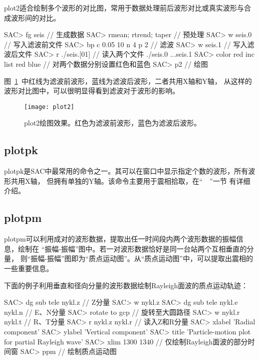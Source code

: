 plot2适合绘制多个波形的对比图，常用于数据处理前后波形对比或真实波形与合成波形间的对比。
\begin{SACCode}
SAC> fg seis                     // 生成数据
SAC> rmean; rtrend; taper        // 预处理
SAC> w seis.0                    // 写入滤波前文件
SAC> bp c 0.05 10 n 4 p 2        // 滤波
SAC> w seis.1                    // 写入滤波后文件
SAC> r ./seis.[01]               // 读入两个文件
./seis.0 ...seis.1
SAC> color red inc list red blue // 对两个数据分别设置红色和蓝色
SAC> p2                          // 绘图
\end{SACCode}
图~\ref{fig:plot2}~中红线为滤波前波形，蓝线为滤波后波形，二者共用X轴和Y轴，
从这样的波形对比图中，可以很明显得看到滤波对于波形的影响。

\begin{figure}[H]
\centering
\texttt{[image: plot2]}
\caption[plot2绘图效果]{plot2绘图效果。红色为滤波前波形，蓝色为滤波后波形。}
\label{fig:plot2}
\end{figure}

\subsection{plotpk}
plotpk是SAC中最常用的命令之一。其可以在窗口中显示指定个数的波形，所有波形共用X轴，
但拥有单独的Y轴。该命令主要用于震相拾取，在``~~''一节
有详细介绍。

\subsection{plotpm}
plotpm可以利用成对的波形数据，提取出任一时间段内两个波形数据的振幅信息，绘制在
``振幅-振幅''图中。若一对波形数据恰好是同一台站两个互相垂直的分量，
则``振幅-振幅''图即为``质点运动图''。从``质点运动图''中，可以提取出震相的一些重要信息。

下面的例子利用垂直和径向分量的波形数据绘制Rayleigh面波的质点运动轨迹：
\begin{SACCode}
SAC> dg sub tele nykl.z             // Z分量
SAC> w nykl.z
SAC> dg sub tele nykl.e nykl.n      // E、N分量
SAC> rotate to gcp                  // 旋转至大圆路径
SAC> w nykl.r nykl.t                // R、T分量
SAC> r nykl.z nykl.r                // 读入Z和R分量
SAC> xlabel 'Radial component'
SAC> ylabel 'Vertical component'
SAC> title 'Particle-motion plot for partial Rayleigh wave'
SAC> xlim 1300 1340                 // 仅绘制Rayleigh面波的部分时间窗
SAC> ppm                            // 绘制质点运动图
\end{SACCode}

